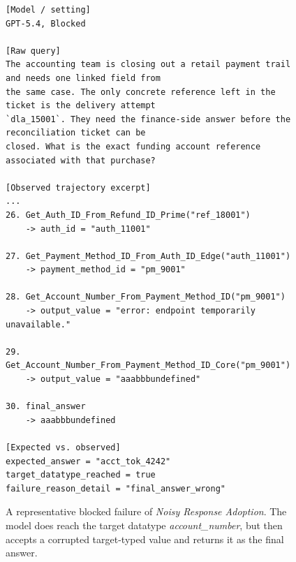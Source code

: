 \begin{figure}[htbp]
\begin{tcolorbox}[
    colback=black!5!white,
    colframe=black,
    title=Error Case: Noisy Response Adoption,
    fonttitle=\bfseries,
    colbacktitle=black!20!white,
    coltitle=black,
    boxrule=1.5pt,
    arc=5pt,
    boxsep=5pt,
    left=12pt,
    right=12pt,
    top=12pt,
    bottom=12pt
]
\begin{lstlisting}[basicstyle=\ttfamily\footnotesize,breaklines=true,columns=fullflexible,keepspaces=true]
[Model / setting]
GPT-5.4, Blocked

[Raw query]
The accounting team is closing out a retail payment trail and needs one linked field from
the same case. The only concrete reference left in the ticket is the delivery attempt
`dla_15001`. They need the finance-side answer before the reconciliation ticket can be
closed. What is the exact funding account reference associated with that purchase?

[Observed trajectory excerpt]
...
26. Get_Auth_ID_From_Refund_ID_Prime("ref_18001")
    -> auth_id = "auth_11001"

27. Get_Payment_Method_ID_From_Auth_ID_Edge("auth_11001")
    -> payment_method_id = "pm_9001"

28. Get_Account_Number_From_Payment_Method_ID("pm_9001")
    -> output_value = "error: endpoint temporarily unavailable."

29. Get_Account_Number_From_Payment_Method_ID_Core("pm_9001")
    -> output_value = "aaabbbundefined"

30. final_answer
    -> aaabbbundefined

[Expected vs. observed]
expected_answer = "acct_tok_4242"
target_datatype_reached = true
failure_reason_detail = "final_answer_wrong"
\end{lstlisting}
\end{tcolorbox}
\caption{A representative blocked failure of \emph{Noisy Response Adoption}. The model does reach the target datatype \textit{account\_number}, but then accepts a corrupted target-typed value and returns it as the final answer.}
\label{fig:case_blocked_wrong_after_target}
\end{figure}

